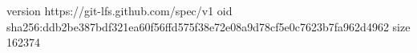 version https://git-lfs.github.com/spec/v1
oid sha256:ddb2be387bdf321ea60f56ffd575f38e72e08a9d78cf5e0c7623b7fa962d4962
size 162374
